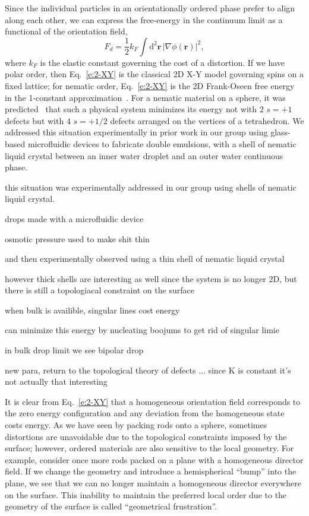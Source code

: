 Since the individual particles in an orientationally ordered phase prefer to align along each other, we can express the free-energy in the continuum limit as a functional of the orientation field,
\begin{equation}
  F_d = \frac{1}{2} k_F \int \textrm{d}^2\mathbf{r} \, |\nabla \phi(\mathbf{r})|^2,\label{e:2-XY}
\end{equation}
where $k_F$ is the elastic constant governing the cost of a distortion.
If we have polar order, then Eq.~\ref{e:2-XY} is the classical 2D X-Y model governing spins on a fixed lattice; for nematic order, Eq.~\ref{e:2-XY} is the 2D Frank-Oseen free energy~\cite{RN61} in the 1-constant approximation~\cite{RN33}.
For a nematic material on a sphere, it was predicted~\cite{RN42,RN104,RN43} that such a physical system minimizes its energy not with $2$ $s=+1$ defects but with $4$ $s=+1/2$ defects arranged on the vertices of a tetrahedron.
We addressed this situation experimentally in prior work in our group using glass-based microfluidic devices to fabricate double emulsions, with a shell of nematic liquid crystal between an inner water droplet and an outer water continuous phase. 




this situation was experimentally addressed in our group using shells of nematic liquid crystal.

drops made with a microfluidic device

osmotic pressure used to make shit thin

 and then experimentally observed using a thin shell of nematic liquid crystal~\cite{RN105}

however thick shells are interesting as well since the system is no longer 2D, but there is still a topologiacal constraint on the surface

when bulk is availible, singular lines cost energy


can minimize this energy by nucleating boojums to get rid of singular limie

in bulk drop limit we see bipolar drop

new para, return to the topological  theory of defects ... since K is constant it's not actually that interesting


It is clear from Eq.~\ref{e:2-XY} that a homogeneous orientation field corresponds to the zero energy configuration and any deviation from the homogeneous state costs energy.
As we have seen by packing rods onto a sphere, sometimes distortions are unavoidable due to the topological constraints imposed by the surface; however, ordered materials are also sensitive to the local geometry.
For example, consider once more rods packed on a plane with a homogeneous director field.
If we change the geometry and introduce a hemispherical ``bump'' into the plane, we see that we can no longer maintain a homogeneous director everywhere on the surface.
This inability to maintain the preferred local order due to the geometry of the surface is called ``geometrical frustration''.

